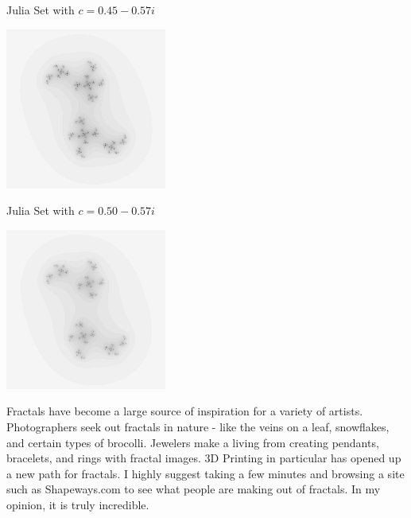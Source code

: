 \documentclass{article}
\begin{document}
\begin{center}
\bigskip
Julia Set with $c = 0.45 - 0.57i$

\includegraphics{Julia7}

Julia Set with $c = 0.50 - 0.57i$

\includegraphics{Julia8}

\clearpage

\end{center}

Fractals have become a large source of inspiration for a variety of artists.  Photographers seek out fractals in nature - like the veins on a leaf, snowflakes, and certain types of brocolli.  Jewelers make a living from creating pendants, bracelets, and rings with fractal images.  3D Printing in particular has opened up a new path for fractals.  I highly suggest taking a few minutes and browsing a site such as Shapeways.com to see what people  are making out of fractals.  In my opinion, it is truly incredible.  
\end{document}
